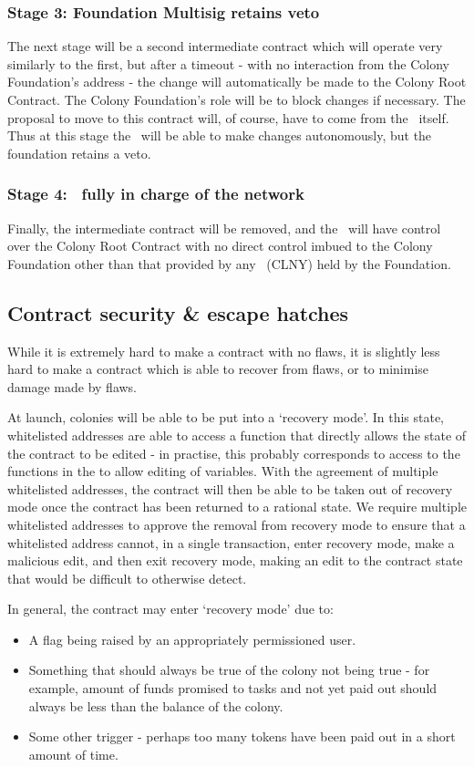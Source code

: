 \subsubsection*{Stage 3: Foundation Multisig retains veto}
The next stage will be a second intermediate contract which will operate very similarly to the first, but after a timeout - with no interaction from the Colony Foundation's address - the change will automatically be made to the Colony Root Contract. The Colony Foundation's role will be to block changes if necessary. The proposal to move to this contract will, of course, have to come from the \rc\ itself.  Thus at this stage the \rc\ will be able to make changes autonomously, but the foundation retains a veto.

\subsubsection*{Stage 4: \rc\ fully in charge of the network}
Finally, the intermediate contract will be removed, and the \rc\ will have control over the Colony Root Contract with no direct control imbued to the Colony Foundation other than that provided by any \rct\ (CLNY) held by the Foundation. 

\subsection{Contract security \& escape hatches}
While it is extremely hard to make a contract with no flaws, it is slightly less hard to make a contract which is able to recover from flaws, or to minimise damage made by flaws.

At launch, colonies will be able to be put into a `recovery mode'. In this state, whitelisted addresses are able to access a function that directly allows the state of the contract to be edited - in practise, this probably corresponds to access to the functions in the  to allow editing of variables. With the agreement of multiple whitelisted addresses, the contract will then be able to be taken out of recovery mode once the contract has been returned to a rational state. We require multiple whitelisted addresses to approve the removal from recovery mode to ensure that a whitelisted address cannot, in a single transaction, enter recovery mode, make a malicious edit, and then exit recovery mode, making an edit to the contract state that would be difficult to otherwise detect.

In general, the contract may enter `recovery mode' due to:
\begin{itemize}
 \item A flag being raised by an appropriately permissioned user.
 \item Something that should always be true of the colony not being true - for example, amount of funds promised to tasks and not yet paid out should always be less than the balance of the colony.
 \item Some other trigger - perhaps too many tokens have been paid out in a short amount of time.
\end{itemize}

